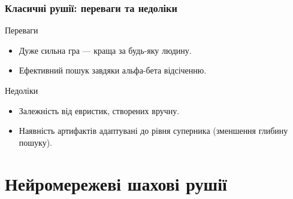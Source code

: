 \documentclass[
    10pt,
]{beamer}
\begin{document}
\begin{frame}[t]
    \frametitle{Класичні рушії: переваги та недоліки}
    \begin{block}{Переваги}
        \begin{itemize}
            \item Дуже сильна гра — краща за будь-яку людину.
            \item Ефективний пошук завдяки альфа-бета відсіченню.
        \end{itemize}
    \end{block}

    \begin{block}{Недоліки}
        \begin{itemize}
            \item Залежність від евристик, створених вручну.
            \item Наявність артифактів адаптувані до рівня суперника (зменшення глибину пошуку).
        \end{itemize}
    \end{block}
\end{frame}

\section{Нейромережеві шахові рушії}
\end{document}

